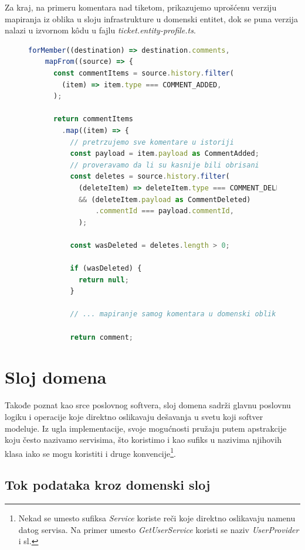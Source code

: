 \documentclass[12pt,oneside]{memoir}
\begin{document}
\newpage
Za kraj, na primeru komentara nad tiketom, prikazujemo uprošćenu verziju mapiranja iz oblika u sloju infrastrukture u domenski entitet, dok se puna verzija nalazi u izvornom k\^{o}du u fajlu \textit{ticket.entity-profile.ts}.

\begin{figure}[h]
\begin{lstlisting}[language=JavaScript, style=ES6, caption={Mapiranje komentara tiketa.}]
  forMember((destination) => destination.comments,
    mapFrom((source) => {
      const commentItems = source.history.filter(
        (item) => item.type === COMMENT_ADDED,
      );

      return commentItems
        .map((item) => {
          // pretrzujemo sve komentare u istoriji
          const payload = item.payload as CommentAdded;
          // proveravamo da li su kasnije bili obrisani
          const deletes = source.history.filter(
            (deleteItem) => deleteItem.type === COMMENT_DELETED 
            && (deleteItem.payload as CommentDeleted)
                .commentId === payload.commentId,
            );
          
          const wasDeleted = deletes.length > 0;

          if (wasDeleted) {
            return null;
          }

          // ... mapiranje samog komentara u domenski oblik...

          return comment;

\end{lstlisting}
\end{figure}



\newpage
\section{Sloj domena}

Takođe poznat kao srce poslovnog softvera, sloj domena sadrži glavnu poslovnu logiku i operacije koje direktno oslikavaju dešavanja u svetu koji softver modeluje. Iz ugla implementacije, svoje mogućnosti pružaju putem apstrakcije koju često nazivamo servisima, što koristimo i kao sufiks u nazivima njihovih klasa iako se mogu koristiti i druge konvencije\footnote{Nekad se umesto sufiksa \textit{Service} koriste reči koje direktno oslikavaju namenu datog servisa. Na primer umesto \textit{GetUserService} koristi se naziv \textit{UserProvider} i sl.}.

\subsection{Tok podataka kroz domenski sloj}
\end{document}
